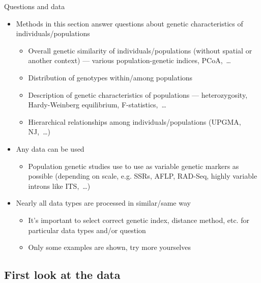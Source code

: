 \documentclass[compress, xelatex, 11pt, xcolor=svgnames, aspectratio=169, url={hyphens, lowtilde}]{beamer}
\begin{document}
\begin{frame}{Questions and data}
	\begin{itemize}
		\item Methods in this section answer questions about genetic characteristics of individuals/populations
		\begin{itemize}
			\item Overall genetic similarity of individuals/populations (without spatial or another context) --- various population-genetic indices, PCoA,~\ldots
			\item Distribution of genotypes within/among populations
			\item Description of genetic characteristics of populations --- heterozygosity, Hardy-Weinberg equilibrium, F-statistics,~\ldots
			\item Hierarchical relationships among individuals/populations (UPGMA, NJ,~\ldots)
		\end{itemize}
		\item Any data can be used
		\begin{itemize}
			\item Population genetic studies use to use as variable genetic markers as possible (depending on scale, e.g. SSRs, AFLP, RAD-Seq, highly variable introns like ITS,~\ldots)
		\end{itemize}
		\item Nearly all data types are processed in similar/same way
		\begin{itemize}
			\item It's important to select correct genetic index, distance method, etc. for particular data types and/or question
			\item Only some examples are shown, try more yourselves
		\end{itemize}
	\end{itemize}
\end{frame}

\subsection{First look at the data}
\end{document}
